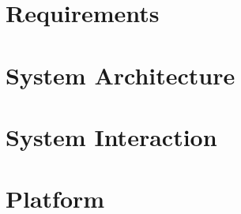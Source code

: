 
\chapter{Requirements}

\chapter{System Architecture}



\chapter{System Interaction}

\chapter{Platform}


%
